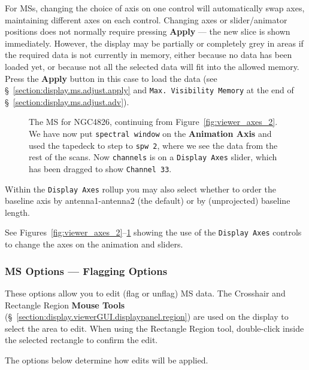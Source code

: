 For MSs, changing the choice of axis on one control will automatically
swap axes, maintaining different axes on each control.  Changing axes
or slider/animator positions does not normally require pressing
{\bf Apply} --- the new slice is shown immediately.  
However, the display may be 
partially or completely grey in areas if the required data is not
currently in memory, either because no data has been loaded yet, or
because not all the selected data will fit into the allowed memory.
Press the {\bf Apply} button in this case to load the data
(see \S~\ref{section:display.ms.adjust.apply} and 
{\tt Max. Visibility Memory} at the end of 
\S~\ref{section:display.ms.adjust.adv}).

\begin{figure}[h!]
\begin{center}
\caption{\label{fig:viewer_axes_3} The MS for NGC4826,
continuing from Figure~\ref{fig:viewer_axes_2}.  
We have now put {\tt spectral window} on the {\bf Animation Axis} 
and used the tapedeck to step to {\tt spw 2}, where we see the
data from the rest of the scans.  Now {\tt channels} is on a
{\tt Display Axes} slider, which has been dragged to show
{\tt Channel 33}.}
\hrulefill
\end{center}
\end{figure}

Within the {\tt Display Axes} rollup you may also select whether to order
the baseline axis by antenna1-antenna2 (the default) or by (unprojected)
baseline length.

See Figures~\ref{fig:viewer_axes_2}--\ref{fig:viewer_axes_3}
showing the use of the {\tt Display Axes} controls to change the axes on the
animation and sliders.

\subsubsection{MS Options --- Flagging Options}
\label{section:display.ms.adjust.flagging}

These options allow you to edit (flag or unflag) MS data.
The Crosshair and Rectangle Region {\bf Mouse Tools}
(\S~\ref{section:display.viewerGUI.displaypanel.region}) are used on
the display to select the area to edit.  When using the Rectangle Region
tool, double-click inside the selected rectangle to confirm the edit.

The options below determine how edits will be applied.

